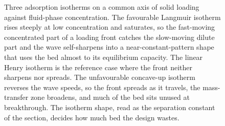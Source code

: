 \begin{figure}[htbp]
\centering
{}
\caption[Three adsorption-isotherm shapes and the front they make]{Three
adsorption isotherms on a common axis of solid loading against fluid-phase
concentration. The favourable Langmuir isotherm rises steeply at low
concentration and saturates, so the fast-moving concentrated part of a
loading front catches the slow-moving dilute part and the wave self-sharpens
into a near-constant-pattern shape that uses the bed almost to its equilibrium
capacity. The linear Henry isotherm is the reference case where the front
neither sharpens nor spreads. The unfavourable concave-up isotherm reverses
the wave speeds, so the front spreads as it travels, the mass-transfer zone
broadens, and much of the bed sits unused at breakthrough. The isotherm shape,
read as the separation constant of the section, decides how much bed the
design wastes.}
\label{fig:vol04ch07:isotherm-shapes}
\end{figure}

